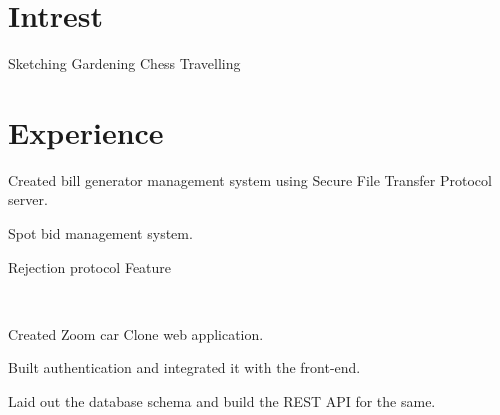 \documentclass[]{deedy-resume-openfont}
\begin{document}
\begin{minipage}[t]{0.43\textwidth}
\vspace{5pt}
\section{Intrest}
\textbullet{} Sketching
\textbullet{} Gardening
\textbullet{} Chess
\textbullet{} Travelling

%
%

\end{minipage} 
\hfill
\begin{minipage}[t]{0.56\textwidth} 


\section{Experience}
\vspace{\topsep}
\begin{tightemize}
\item Created bill generator management system using Secure File Transfer Protocol server. 
\item Spot bid management system.
\item Rejection protocol Feature 
\end{tightemize}
\ \ \ \ \ \ 
\sectionsep

\begin{tightemize}
\item Created Zoom car Clone web application.
\item Built authentication and integrated it with the front-end.
\item Laid out the database schema and build the REST API for the same.
\end{tightemize}
\ \ \ \ \ \ 


\end{minipage}
\end{document}
